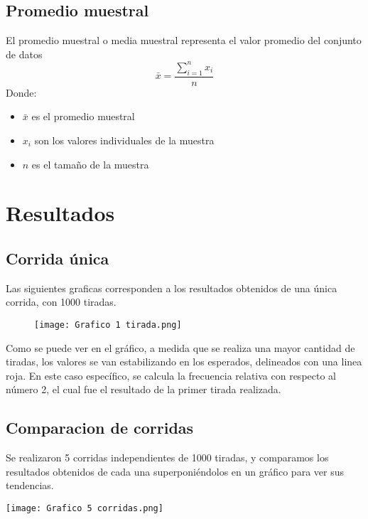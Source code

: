 \documentclass{article}
\begin{document}
\subsection{Promedio muestral}
El promedio muestral o media muestral representa el valor promedio del conjunto de datos
\begin{equation}
\bar{x} = \frac{\sum_{i=1}^{n} x_i}{n}
\end{equation}
Donde:
\begin{itemize}
    \item \(\bar{x}\) es el promedio muestral
    \item \(x_i\) son los valores individuales de la muestra
    \item \(n\) es el tamaño de la muestra
\end{itemize}


\section{Resultados}

\subsection{Corrida única}
Las siguientes graficas corresponden a los resultados obtenidos de una única corrida, con 1000 tiradas.

    \begin{figure}[h]
        \centering
        \texttt{[image: Grafico 1 tirada.png]}
    \end{figure}

Como se puede ver en el gráfico, a medida que se realiza una mayor cantidad de tiradas, los valores se van estabilizando en los esperados, delineados con una linea roja. En este caso específico, se calcula la frecuencia relativa con respecto al número 2, el cual fue el resultado de la primer tirada realizada.
    
\subsection{Comparacion de corridas}
Se realizaron 5 corridas independientes de 1000 tiradas, y comparamos los resultados obtenidos de cada una superponiéndolos en un gráfico para ver sus tendencias.

    \begin{center}
        \texttt{[image: Grafico 5 corridas.png]}
        \label{Grafico 5}
    \end{center}
\end{document}
